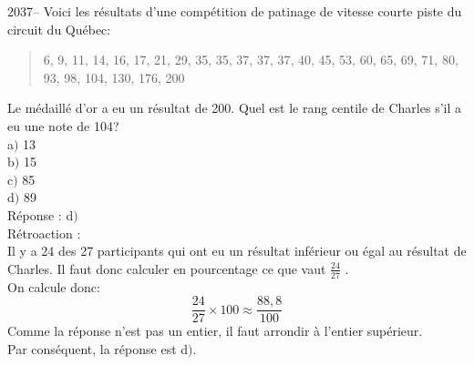 \documentclass[letterpaper, 12pt]{article}
\begin{document}
2037-- Voici les r\'esultats d'une comp\'etition de patinage de vitesse courte piste du circuit du Qu\'ebec:
\begin{quote}
6, 9, 11, 14, 16, 17, 21, 29, 35, 35, 37, 37, 37, 40, 45, 53, 60, 65, 69, 71, 80, 93, 98, 104, 130, 176, 200
\end{quote}
Le m\'edaill\'e d'or a eu un r\'esultat de 200. Quel est le rang centile de Charles s'il a eu une note de 104? \\

a$)$ 13\\
b$)$ 15\\
c$)$ 85\\
d$)$ 89\\

R\'eponse : d$)$\\

R\'etroaction :\\
Il y a 24 des 27 participants qui ont eu un r\'esultat inf\'erieur ou \'egal au r\'esultat de Charles. Il faut donc calculer en pourcentage ce que vaut $\frac{24}{27}$ . \\
On calcule donc:  \\
\begin{equation*}
\frac{24}{27}\times 100 \approx \frac{88,8}{100}
\end{equation*}
Comme la r\'eponse n'est pas un entier, il faut arrondir \`a l'entier sup\'erieur.\\
Par cons\'equent, la r\'eponse est d$)$.\\

\end{document}
